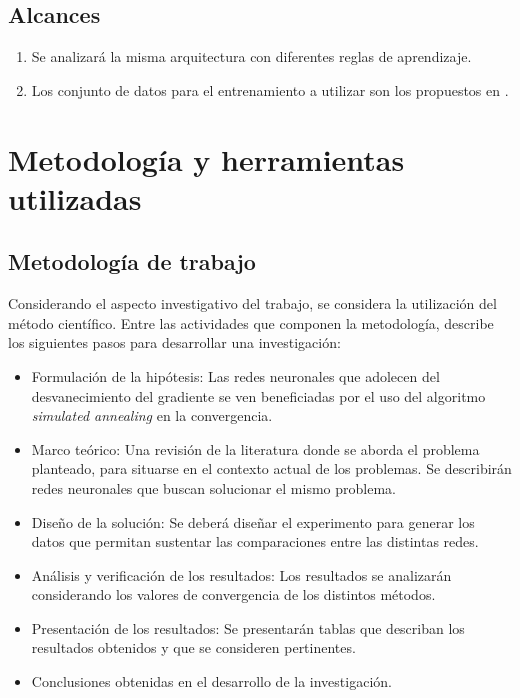 \subsection{Alcances}
\begin{enumerate}
	\item Se analizará la misma arquitectura con diferentes reglas de aprendizaje.
	\item Los conjunto de datos para el entrenamiento a utilizar son los propuestos en \cite{Morse2016}.
\end{enumerate}

\section{Metodología y herramientas utilizadas}
\subsection{Metodología de trabajo}
Considerando el aspecto investigativo del trabajo, se considera la utilización del método científico. Entre las actividades que componen la metodología,  describe los siguientes pasos para desarrollar una investigación:

\begin{itemize}
	\item Formulación de la hipótesis: Las redes neuronales que adolecen del desvanecimiento del gradiente se ven beneficiadas por el uso del algoritmo {\em simulated annealing} en la convergencia.

	\item Marco teórico: Una revisión de la literatura donde se aborda el problema planteado, para situarse en el contexto actual de los problemas. Se describirán redes neuronales que buscan solucionar el mismo problema.

	\item Diseño de la solución: Se deberá diseñar el experimento para generar los datos que permitan sustentar las comparaciones entre las distintas redes.%

	\item Análisis y verificación de los resultados: Los resultados se analizarán considerando los valores de convergencia de los distintos métodos.

	\item Presentación de los resultados: Se presentarán tablas que describan los resultados obtenidos y que se consideren pertinentes.

	\item Conclusiones obtenidas en el desarrollo de la investigación.
\end{itemize}

